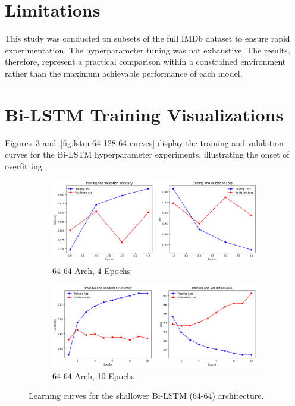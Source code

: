 \documentclass[11pt]{article}
\begin{document}
\section*{Limitations}
This study was conducted on subsets of the full IMDb dataset to ensure rapid experimentation. The hyperparameter tuning was not exhaustive. The results, therefore, represent a practical comparison within a constrained environment rather than the maximum achievable performance of each model.

\appendix

\section{Bi-LSTM Training Visualizations}
\label{sec:appendix}

Figures~\ref{fig:lstm-64-64-curves} and~\ref{fig:lstm-64-128-64-curves} display the training and validation curves for the Bi-LSTM hyperparameter experiments, illustrating the onset of overfitting.

\begin{figure}[htbp]
  \centering
  \begin{subfigure}{0.3\textwidth}
    \includegraphics[width=\linewidth]{figs/4_2.png}
    \caption{64-64 Arch, 4 Epochs}
    \label{fig:lstm-64-64-4e}
  \end{subfigure}
  \hfill
  \begin{subfigure}{0.3\textwidth}
    \includegraphics[width=\linewidth]{figs/10_2.png}
    \caption{64-64 Arch, 10 Epochs}
    \label{fig:lstm-64-64-10e}
  \end{subfigure}
  \caption{Learning curves for the shallower Bi-LSTM (64-64) architecture.}
  \label{fig:lstm-64-64-curves}
\end{figure}
\end{document}
